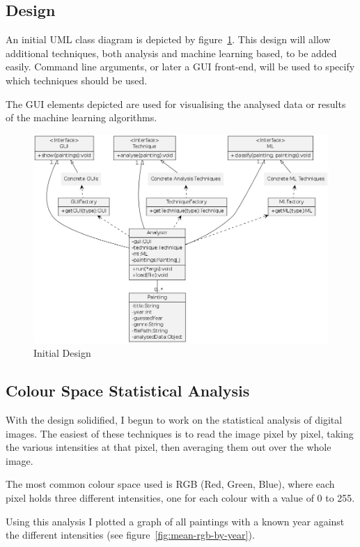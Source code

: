 \documentclass[11pt,fleqn,twoside]{article}
\begin{document}
\subsection{Design}
An initial UML class diagram is depicted by figure~\ref{fig:init-class}. This design will allow 
additional techniques, both analysis and machine learning based, to be added easily. Command line
arguments, or later a GUI front-end, will be used to specify which techniques should be used.

The GUI elements depicted are used for visualising the analysed data or results of the machine
learning algorithms.

\begin{figure}[p!]
\includegraphics[scale=0.5]{img/design.png}
\caption{Initial Design}
\label{fig:init-class}
\end{figure}

\subsection{Colour Space Statistical Analysis}
With the design solidified, I begun to work on the statistical analysis of digital images. The 
easiest of these techniques is to read the image pixel by pixel, taking the various intensities at
that pixel, then averaging them out over the whole image.

The most common colour space used is RGB (Red, Green, Blue), where each pixel holds three different
intensities, one for each colour with a value of 0 to 255.

Using this analysis I plotted a graph of all paintings with a known year against the different 
intensities (see figure~\ref{fig:mean-rgb-by-year}).
\end{document}
